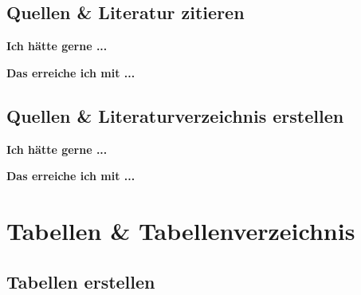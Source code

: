 \documentclass[twoside, 
               a4paper, 
               10pt, 
               parskip=full, 
               sectionentrydots=true, 
               listof=totoc, 
               listof=entryprefix,
               numbers=endperiod]{scrartcl}
\begin{document}
\subsection{{Quellen \& Literatur zitieren}}

{\textbf {Ich hätte gerne ...}}
 



\newpage
{\textbf {Das erreiche ich mit ...}}
 
\begin{miniSeite}[colbacktitle=black!35!white,title=\LaTeX-Code]

\end{miniSeite}




\newpage
\subsection{{Quellen \& Literaturverzeichnis erstellen}}
{\textbf {Ich hätte gerne ...}}
 
\begin{miniSeite}[colbacktitle=black!35!white,title=Ausdruck]

\end{miniSeite}


\newpage
{\textbf {Das erreiche ich mit ...}}
 
\begin{miniSeite}[colbacktitle=black!35!white,title=\LaTeX-Code]

\end{miniSeite}





\newpage
\section{Tabellen \& Tabellenverzeichnis}
\subsection{Tabellen erstellen}
\end{document}
